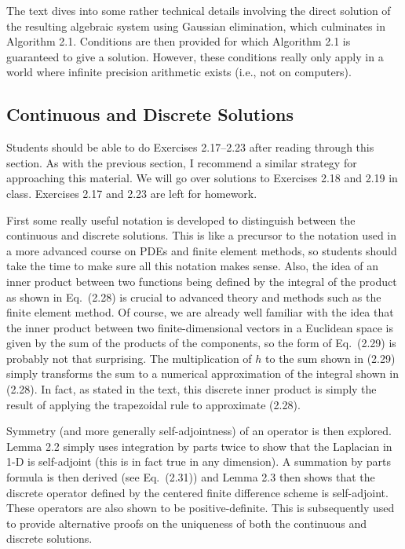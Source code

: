 \documentclass{amsart}
\theoremstyle{plain}
\theoremstyle{definition}
\theoremstyle{remark}
\theoremstyle{definition}
\numberwithin{equation}{section}
\numberwithin{equation}{section}
\begin{document}
The text dives into some rather technical details involving the direct solution of the resulting algebraic system using Gaussian elimination, which culminates in Algorithm 2.1. 
Conditions are then provided for which Algorithm 2.1 is guaranteed to give a solution.
However, these conditions really only apply in a world where infinite precision arithmetic exists (i.e., not on computers). 





\subsection{Continuous and Discrete Solutions}

Students should be able to do Exercises 2.17--2.23 after reading through this section.
As with the previous section, I recommend a similar strategy for approaching this material.
We will go over solutions to Exercises 2.18 and 2.19 in class. 
Exercises 2.17 and 2.23 are left for homework. 


First some really useful notation is developed to distinguish between the continuous and discrete solutions.
This is like a precursor to the notation used in a more advanced course on PDEs and finite element methods, so students should take the time to make sure all this notation makes sense.
Also, the idea of an inner product between two functions being defined by the integral of the product as shown in Eq.~(2.28) is crucial to advanced theory and methods such as the finite element method.
Of course, we are already well familiar with the idea that the inner product between two finite-dimensional vectors in a Euclidean space is given by the sum of the products of the components, so the form of Eq.~(2.29) is probably not that surprising. 
The multiplication of $h$ to the sum shown in (2.29) simply transforms the sum to a numerical approximation of the integral shown in (2.28).
In fact, as stated in the text, this discrete inner product is simply the result of applying the trapezoidal rule to approximate (2.28). 

Symmetry (and more generally self-adjointness) of an operator is then explored.
Lemma 2.2 simply uses integration by parts twice to show that the Laplacian in 1-D is self-adjoint (this is in fact true in any dimension). 
A summation by parts formula is then derived (see Eq.~(2.31)) and Lemma 2.3 then shows that the discrete operator defined by the centered finite difference scheme is self-adjoint. 
These operators are also shown to be positive-definite.
This is subsequently used to provide alternative proofs on the uniqueness of both the continuous and discrete solutions. 
\end{document}

